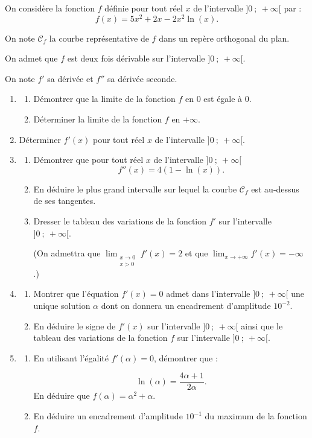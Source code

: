 
\medskip

On considère la fonction $f$ définie pour tout réel $x$ de l'intervalle $]0~;~+\infty[$  par :
\[f(x) = 5x^2 + 2x - 2x^2\ln (x).\]

On note $\mathcal{C}_f$ la courbe représentative de $f$ dans un repère orthogonal du plan.

On admet que $f$ est deux fois dérivable sur l'intervalle $]0~;~+\infty[$.

On note $f'$ sa dérivée et $f''$ sa dérivée seconde.

\medskip

\begin{enumerate}
\item 
	\begin{enumerate}
		\item Démontrer que la limite de la fonction $f$ en $0$ est égale à $0$.
		\item Déterminer la limite de la fonction $f$ en $+ \infty$.
	\end{enumerate}
\item Déterminer $f'(x)$ pour tout réel $x$ de l'intervalle $]0~;~+\infty[$.
\item 
	\begin{enumerate}
		\item Démontrer que pour tout réel $x$ de l'intervalle $]0~;~+\infty[$
\[f''(x) = 4(1 - \ln (x)).\]
		\item En déduire le plus grand intervalle sur lequel la courbe $\mathcal{C}_f$ est au-dessus de ses tangentes.
		\item Dresser le tableau des variations de la fonction $f'$ sur l'intervalle $]0~;~+\infty[$.

(On admettra que $\displaystyle\lim_{\substack{x \to 0\\x>0}} f'(x) = 2$ et que $\displaystyle\lim_{x \to + \infty} f'(x) = - \infty$.)
	\end{enumerate}	
\item 
	\begin{enumerate}
		\item Montrer que l'équation $f'(x) = 0$ admet dans l'intervalle $]0~;~+\infty[$ une unique solution $\alpha$ dont on donnera un encadrement d'amplitude $10^{-2}$.
		\item En déduire le signe de $f'(x)$ sur l'intervalle $]0~;~+\infty[$ ainsi que le tableau des variations de la fonction $f$ sur l'intervalle $]0~;~+\infty[$.
	\end{enumerate}
\item 
	\begin{enumerate}
		\item En utilisant l'égalité $f'(\alpha) = 0$, démontrer que : 
		
\[\ln (\alpha) = \dfrac{4\alpha + 1}{2\alpha}.\]
 En déduire que $f(\alpha) = \alpha^2 + \alpha$.
		\item En déduire un encadrement d'amplitude $10^{-1}$ du maximum de la fonction $f$.
	\end{enumerate}
\end{enumerate}

